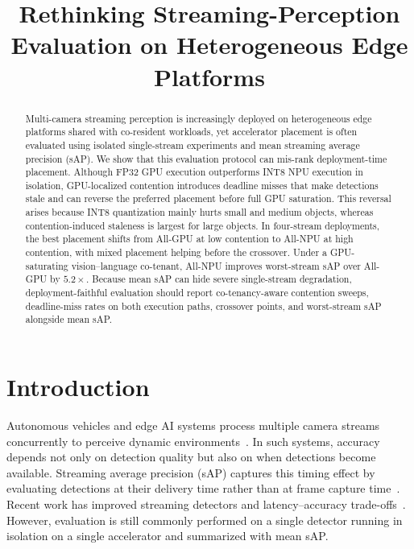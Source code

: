 \documentclass[runningheads]{llncs}
\begin{document}
\title{Rethinking Streaming-Perception Evaluation on Heterogeneous Edge Platforms}


\maketitle

\begin{abstract}
Multi-camera streaming perception is increasingly deployed on heterogeneous edge platforms shared with co-resident workloads, yet accelerator placement is often evaluated using isolated single-stream experiments and mean streaming average precision (sAP). We show that this evaluation protocol can mis-rank deployment-time placement. Although FP32 GPU execution outperforms INT8 NPU execution in isolation, GPU-localized contention introduces deadline misses that make detections stale and can reverse the preferred placement before full GPU saturation. This reversal arises because INT8 quantization mainly hurts small and medium objects, whereas contention-induced staleness is largest for large objects. In four-stream deployments, the best placement shifts from All-GPU at low contention to All-NPU at high contention, with mixed placement helping before the crossover. Under a GPU-saturating vision--language co-tenant, All-NPU improves worst-stream sAP over All-GPU by $5.2\times$. Because mean sAP can hide severe single-stream degradation, deployment-faithful evaluation should report co-tenancy-aware contention sweeps, deadline-miss rates on both execution paths, crossover points, and worst-stream sAP alongside mean sAP.
\end{abstract}



\section{Introduction}

Autonomous vehicles and edge AI systems process multiple camera streams concurrently to perceive dynamic environments~\cite{argoverse,waymo}. In such systems, accuracy depends not only on detection quality but also on when detections become available. Streaming average precision (sAP) captures this timing effect by evaluating detections at their delivery time rather than at frame capture time~\cite{streaming-perception}. Recent work has improved streaming detectors and latency--accuracy trade-offs~\cite{streamyolo,damo-streamnet,asap,longshortnet}. However, evaluation is still commonly performed on a single detector running in isolation on a single accelerator and summarized with mean sAP.
\end{document}
